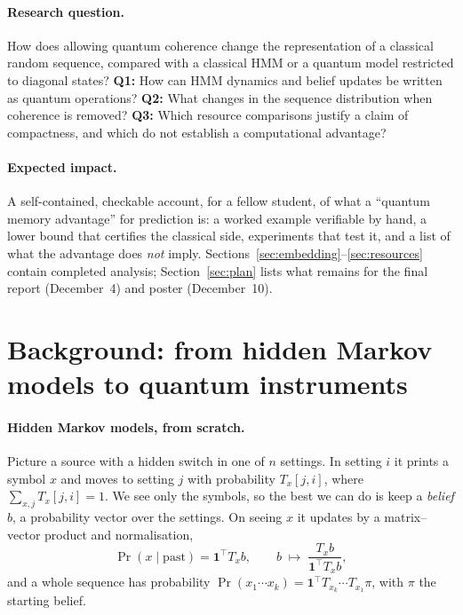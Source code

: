 \documentclass[11pt]{article}
\newcommand{\one}{\mathbf{1}}
\begin{document}
\paragraph{Research question.} How does allowing quantum coherence change the representation of a classical random sequence, compared with a classical HMM or a quantum model restricted to diagonal states? \textbf{Q1:} How can HMM dynamics and belief updates be written as quantum operations? \textbf{Q2:} What changes in the sequence distribution when coherence is removed? \textbf{Q3:} Which resource comparisons justify a claim of compactness, and which do not establish a computational advantage?

\paragraph{Expected impact.} A self-contained, checkable account, for a fellow student, of what a ``quantum memory advantage'' for prediction is: a worked example verifiable by hand, a lower bound that certifies the classical side, experiments that test it, and a list of what the advantage does \emph{not} imply. Sections~\ref{sec:embedding}--\ref{sec:resources} contain completed analysis; Section~\ref{sec:plan} lists what remains for the final report (December~4) and poster (December~10).

\section{Background: from hidden Markov models to quantum instruments}\label{sec:background}

\paragraph{Hidden Markov models, from scratch.} Picture a source with a hidden switch in one of $n$ settings. In setting $i$ it prints a symbol $x$ and moves to setting $j$ with probability $T_x[j,i]$, where $\sum_{x,j} T_x[j,i] = 1$. We see only the symbols, so the best we can do is keep a \emph{belief} $b$, a probability vector over the settings. On seeing $x$ it updates by a matrix--vector product and normalisation,
\begin{equation}\label{eq:hmm-update}
  \Pr(x \mid \text{past}) = \one^{\top} T_x b, \qquad b \;\mapsto\; \frac{T_x b}{\one^{\top} T_x b},
\end{equation}
and a whole sequence has probability $\Pr(x_1\cdots x_k) = \one^{\top} T_{x_k}\cdots T_{x_1}\pi$, with $\pi$ the starting belief.
\end{document}
